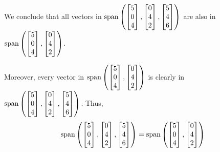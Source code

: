 \documentclass{ximera}
\begin{document}
\begin{example}
\begin{explanation}
We conclude that all vectors in $\textnormal{span}\left(\begin{bmatrix}5\\0\\4\end{bmatrix}, \begin{bmatrix}0\\4\\2\end{bmatrix},\begin{bmatrix}5\\4\\6\end{bmatrix}\right)$ are also in $\textnormal{span}\left(\begin{bmatrix}5\\0\\4\end{bmatrix}, \begin{bmatrix}0\\4\\2\end{bmatrix}\right)$.  

Moreover, every vector in $\textnormal{span}\left(\begin{bmatrix}5\\0\\4\end{bmatrix}, \begin{bmatrix}0\\4\\2\end{bmatrix}\right)$ is clearly in $\textnormal{span}\left(\begin{bmatrix}5\\0\\4\end{bmatrix}, \begin{bmatrix}0\\4\\2\end{bmatrix},\begin{bmatrix}5\\4\\6\end{bmatrix}\right)$.
Thus,
$$\textnormal{span}\left(\begin{bmatrix}5\\0\\4\end{bmatrix}, \begin{bmatrix}0\\4\\2\end{bmatrix},\begin{bmatrix}5\\4\\6\end{bmatrix}\right)=\textnormal{span}\left(\begin{bmatrix}5\\0\\4\end{bmatrix}, \begin{bmatrix}0\\4\\2\end{bmatrix}\right)$$


\end{explanation}
\end{example}
\end{document}

